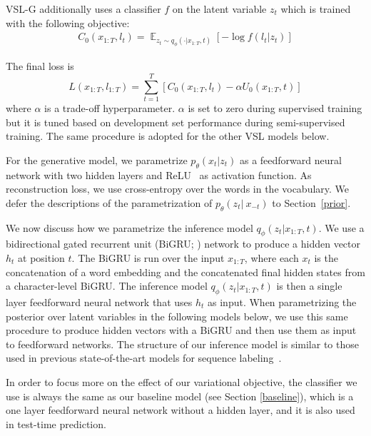 \documentclass[11pt,a4paper]{article}
\newcommand{\vsmg}{VSL-G\xspace}
\begin{document}
\noindent \vsmg additionally uses a classifier $f$ on the latent variable $z_t$ which is trained with the following objective:
\begin{equation}
\begin{aligned}
C_0(x_{1:T}, l_{t}) = \mathop\mathbb{E}_{z_t\sim q_\phi(\cdot\vert x_{1:T},t)}
[-\log f(l_t\vert z_t)]
\end{aligned}
\label{eq:ce_rec}
\end{equation}

\noindent The final loss is
\begin{equation}
L(x_{1:T},l_{1:T}) = \sum_{t=1}^T[C_0(x_{1:T}, l_{t}) - \alpha U_0(x_{1:T}, t)]\nonumber
\end{equation}
where $\alpha$ is a trade-off hyperparameter. $\alpha$ is set to zero during supervised training but it is tuned based on development set performance during semi-supervised training. The same procedure is adopted for the other VSL models below.

For the generative model, we parametrize $p_\theta(x_t\vert z_t)$ as a feedforward neural network with two hidden layers and ReLU~\cite{nair2010rectified}
as activation function. As reconstruction loss, we use cross-entropy over the words in the vocabulary.
We defer the descriptions of the parametrization of $p_\theta(z_t\vert~x_{-t})$ to Section~\ref{prior}.

We now discuss how we parametrize the inference model $q_{\phi}(z_t\vert x_{1:T},t)$.
We use a bidirectional gated recurrent unit (BiGRU; \citealp{chung2014empirical}) network to produce a  hidden vector $h_t$ at position $t$. The BiGRU is run over the input $x_{1:T}$, where each $x_t$ is the concatenation of a word embedding and the concatenated final hidden states from a character-level BiGRU.
The inference model $q_{\phi}(z_t\vert x_{1:T},t)$ is then a single layer feedforward neural network that uses $h_t$ as input.
When parametrizing the posterior over latent variables in the following models below, we use this same procedure to produce hidden vectors with a BiGRU and then use them as input to feedforward networks. The structure of our inference model is similar to those used in previous state-of-the-art models for sequence labeling~\cite{lample2016neural,yang2017transfer}.

In order to focus more on the effect of our variational objective, the classifier we use is always the same as our baseline model (see Section \ref{baseline}), which is a one layer feedforward neural network without a hidden layer, and it is also used in test-time prediction.
\end{document}
